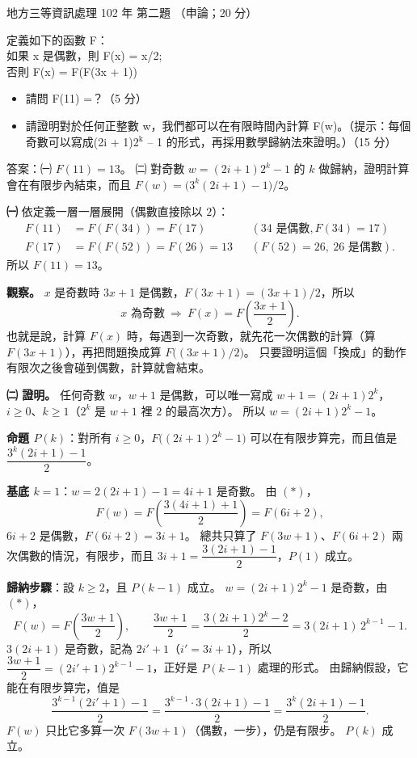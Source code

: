 \begin{pastexam}[label={px:df3-102-ds-02}]{地方三等資訊處理 102 年 第二題}
（申論；20 分）

定義如下的函數 F：\\
如果 x 是偶數，則 F(x) = x/2;\\
否則 F(x) = F(F(3x + 1))
\begin{itemize}[leftmargin=2.2em]
\item[㈠] 請問 F(11) =？（5 分）
\item[㈡] 請證明對於任何正整數 w，我們都可以在有限時間內計算 F(w)。（提示：每個奇數可以寫成(2i + 1)2$^\text{k}$
– 1 的形式，再採用數學歸納法來證明。）（15 分）
\end{itemize}
\end{pastexam}

\begin{pastsoln}
答案：㈠ $F(11) = 13$。 ㈡ 對奇數 $w = (2i+1)2^k - 1$ 的 $k$ 做歸納，證明計算會在有限步內結束，而且
$F(w) = \bigl(3^k(2i + 1) - 1\bigr)/2$。

\textbf{㈠} 依定義一層一層展開（偶數直接除以 $2$）：
\begin{align*}
F(11) &= F(F(34)) = F(17) && (34 \text{ 是偶數}, F(34) = 17)\\
F(17) &= F(F(52)) = F(26) = 13 && (F(52) = 26,\ 26 \text{ 是偶數}).
\end{align*}
所以 $F(11) = 13$。

\textbf{觀察。} $x$ 是奇數時 $3x + 1$ 是偶數，$F(3x + 1) = (3x + 1)/2$，所以
\[
x \text{ 為奇數} \ \Longrightarrow\ F(x) = F\!\left(\frac{3x + 1}{2}\right). \tag{$*$}
\]
也就是說，計算 $F(x)$ 時，每遇到一次奇數，就先花一次偶數的計算（算 $F(3x+1)$），再把問題換成算
$F\bigl((3x+1)/2\bigr)$。 只要證明這個「換成」的動作有限次之後會碰到偶數，計算就會結束。

\textbf{㈡ 證明。} 任何奇數 $w$，$w + 1$ 是偶數，可以唯一寫成 $w + 1 = (2i + 1)2^k$，$i \ge 0$、$k \ge 1$（$2^k$ 是
$w + 1$ 裡 $2$ 的最高次方）。 所以 $w = (2i + 1)2^k - 1$。

\textbf{命題 $P(k)$}：對所有 $i \ge 0$，$F\bigl((2i+1)2^k - 1\bigr)$ 可以在有限步算完，而且值是
$\dfrac{3^k(2i + 1) - 1}{2}$。

\textbf{基底 $k = 1$}：$w = 2(2i + 1) - 1 = 4i + 1$ 是奇數。 由 $(*)$，
\[
F(w) = F\!\left(\frac{3(4i + 1) + 1}{2}\right) = F(6i + 2),
\]
$6i + 2$ 是偶數，$F(6i + 2) = 3i + 1$。 總共只算了 $F(3w + 1)$、$F(6i + 2)$ 兩次偶數的情況，有限步，而且
$3i + 1 = \dfrac{3(2i + 1) - 1}{2}$，$P(1)$ 成立。

\textbf{歸納步驟}：設 $k \ge 2$，且 $P(k - 1)$ 成立。 $w = (2i + 1)2^k - 1$ 是奇數，由 $(*)$，
\[
F(w) = F\!\left(\frac{3w + 1}{2}\right), \qquad
\frac{3w + 1}{2} = \frac{3(2i+1)2^k - 2}{2} = 3(2i + 1)\,2^{k-1} - 1 .
\]
$3(2i + 1)$ 是奇數，記為 $2i' + 1$（$i' = 3i + 1$），所以 $\dfrac{3w+1}{2} = (2i' + 1)2^{k-1} - 1$，正好是
$P(k-1)$ 處理的形式。 由歸納假設，它能在有限步算完，值是
\[
\frac{3^{k-1}(2i' + 1) - 1}{2} = \frac{3^{k-1} \cdot 3(2i+1) - 1}{2} = \frac{3^k(2i+1) - 1}{2}.
\]
$F(w)$ 只比它多算一次 $F(3w + 1)$（偶數，一步），仍是有限步。 $P(k)$ 成立。


\end{pastsoln}

